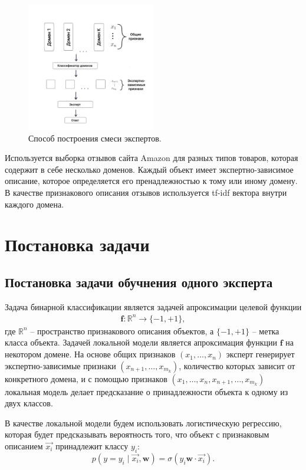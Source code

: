 \documentclass[12pt, twoside]{article}
\begin{document}
\begin{figure}[H]\center
\includegraphics[width=0.5\textwidth]{fig/Schem_1.jpg}
\caption{Способ построения смеси экспертов.}
\label{example:1}
\end{figure}

Используется выборка отзывов сайта Amazon для разных типов товаров, которая содержит в себе несколько доменов. Каждый объект имеет экспертно-зависимое описание, которое определяется его пренадлежностью к тому или иному домену. В качестве признакового описания отзывов используется tf-idf вектора внутри каждого домена. 

\section{Постановка задачи}
\subsection{Постановка задачи обучнения одного эксперта}
Задача бинарной классификации является задачей апроксимации целевой функции
\[
\label{eq:st:1.1}
\begin{aligned}
\mathbf{f}: \mathbb{R}^n \to \{-1, +1\},
\end{aligned}
\]
где $\mathbb{R}^n$ -- пространство признакового описания объектов, а $\{-1, +1\}$ -- метка класса объекта. Задачей локальной модели является апроксимация функции $\mathbf{f}$ на некотором домене. На основе общих признаков $(x_1, \ldots, x_n)$ эксперт генерирует экспертно-зависимые признаки $(x_{n+1}, \ldots, x_{m_k})$, количество которых зависит от конкретного домена, и с помощью признаков $(x_1, \ldots, x_n, x_{n+1}, \ldots, x_{m_k})$ локальная модель делает предсказание о принадлежности объекта к одному из двух классов.

В качестве локальной модели будем использовать логистическую регрессию, которая будет предсказывать вероятность того, что объект с признаковым описанием $\vec{x_i}$ принадлежит классу $y_i$:
\[p\left(y = y_i \mid \vec{x_i}, \mathbf{w}\right) = \sigma(y_i \mathbf{w} \cdot \vec{x_i}).\]
\end{document}
